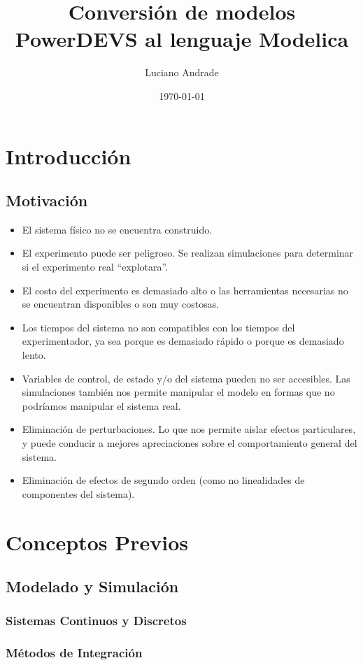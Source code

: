\documentclass{beamer}
\title{Conversión de modelos PowerDEVS al lenguaje Modelica} %
\author{Luciano Andrade} %
\institute[UNR] %
{
Universidad Nacional de Rosario\\ %
\medskip
\textit{andrade.luciano@gmail.com} %
}
\date{\today} %
\newcommand{\quotes}[1]{``#1''}
\begin{document}
\begin{frame}
\titlepage %
\end{frame}

\section{Introducción}
\subsection{Motivación}
\begin{frame}
\begin{itemize}
	\item<1-> El sistema físico no se encuentra construido. 
	
	\item<2-> El experimento puede ser peligroso. Se realizan simulaciones para determinar si el experimento real \quotes{explotara}.

	\item<3-> El costo del experimento es demasiado alto o las herramientas necesarias no se encuentran disponibles o son muy costosas.

	\item<4-> Los tiempos del sistema no son compatibles con los tiempos del experimentador, ya sea porque es demasiado rápido o porque es demasiado lento.

	\item<5-> Variables de control, de estado y/o del sistema pueden no ser accesibles. Las simulaciones también nos permite manipular el modelo en formas que no podríamos manipular el sistema real.

	\item<6-> Eliminación de perturbaciones. Lo que nos permite aislar efectos particulares, y puede conducir a mejores apreciaciones sobre el comportamiento general del sistema.

	\item<7-> Eliminación de efectos de segundo orden (como no linealidades de componentes del sistema). 
\end{itemize}
\end{frame}

\section{Conceptos Previos}
\subsection{Modelado y Simulación}
\subsubsection{Sistemas Continuos y Discretos}
\subsubsection{Métodos de Integración}
\end{document}
